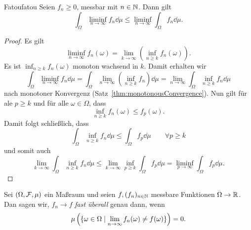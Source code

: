 \documentclass[language=ngerman]{../../Template/TemplateLecture}
\begin{document}
\begin{lem}{Fatou}{fatou}
    Seien $f_n \geq 0$, messbar mit $n \in \mathbb{N}$. Dann gilt 
    \begin{equation}
        \int_\Omega \liminf_{n \to \infty} f_n \dd\mu \leq \liminf_{n \to \infty}\int_\Omega f_n \dd\mu.
    \end{equation}
\end{lem}

\begin{proof}
    Es gilt 
    \begin{equation}
        \liminf_{n \to \infty} f_n(\omega) = \lim_{k \to \infty}\left( \inf_{n \geq k} f_n(\omega) \right).
    \end{equation}
    Es ist $\inf_{n \geq k} f_n(\omega)$ monoton wachsend in $k$. Damit erhalten wir 
    \begin{equation}
        \int_\Omega \liminf_{n \to \infty} f_n \dd\mu = \int_\Omega \lim_{n \to \infty} \left( \inf_{n \geq k} f_n \right) \dd\mu = \lim_{n \to \infty} \int_\Omega \inf_{n \geq k} f_n \dd\mu
    \end{equation}
    nach monotoner Konvergenz (Satz~\ref{thm:monotonousConvergence}). Nun gilt für ale $p \geq k$ und für alle $\omega \in \Omega$, dass 
    \begin{equation}
        \inf_{n \geq k} f_n(\omega) \leq f_p(\omega).
    \end{equation}
    Damit folgt schließlich, dass 
    \begin{equation}
        \int_\Omega \inf_{n \geq k} f_n \dd\mu \leq \int_\Omega f_p \dd\mu \quad \quad \forall p \geq k
    \end{equation}
    und somit auch 
    \begin{equation}
        \lim_{k \to \infty} \int_\Omega \inf_{n \geq k} f_n \dd\mu \leq \lim_{k \to \infty} \inf_{p \geq k}\int_\Omega f_p \dd\mu = \liminf_{p \to \infty} \int_\Omega f_p \dd\mu.
    \end{equation}
\end{proof}



Sei $(\Omega,\mathcal{F},\mu)$ ein Maßraum und seien $f, (f_n)_{n \in \mathbb{N}}$ messbare Funktionen $\Omega \to \mathbb{R}$. Dan sagen wir, $f_n \to f$ \emph{fast überall} genau dann, wenn 
\begin{equation}
    \mu\left( \{\omega \in \Omega \mid \lim_{n \to \infty} f_n(\omega) \neq f(\omega)\} \right) = 0.
\end{equation}
\end{document}
